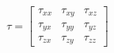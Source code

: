 
\begin{equation}
\tau = \begin{bmatrix}
\tau_{xx} & \tau_{xy} & \tau_{xz}\\
\tau_{yx} & \tau_{yy} & \tau_{yz} \\
\tau_{zx} & \tau_{zy} & \tau_{zz}
\end{bmatrix}
\end{equation}

